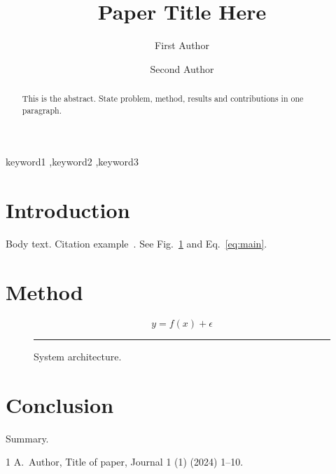 \documentclass[preprint,review,12pt]{elsarticle}
\begin{document}
\begin{frontmatter}

\title{Paper Title Here}

\author[inst1]{First Author}

\author[inst2]{Second Author}


\begin{abstract}
This is the abstract. State problem, method, results and contributions in one paragraph.
\end{abstract}

\begin{keyword}
keyword1 \sep keyword2 \sep keyword3
\end{keyword}

\end{frontmatter}

\section{Introduction}
Body text. Citation example~\cite{ref1}. See Fig.~\ref{fig:arch} and Eq.~\eqref{eq:main}.

\section{Method}
\begin{equation}\label{eq:main}
  y = f(x) + \epsilon
\end{equation}

\begin{figure}[t]
  \centering
  \rule{0.6\textwidth}{3cm}   %
  \caption{System architecture.}
  \label{fig:arch}
\end{figure}

\section{Conclusion}
Summary.


% 
\begin{thebibliography}{1}
A.~Author, Title of paper, Journal 1 (1) (2024) 1--10.
\end{thebibliography}
\end{document}
